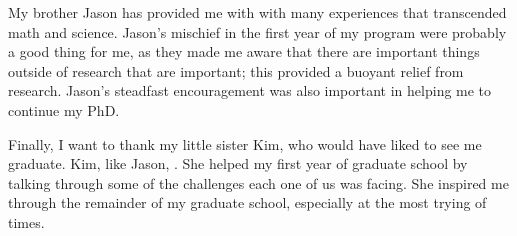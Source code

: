 My brother Jason has provided me with with many experiences that
transcended math and science.  Jason's mischief in the first year of
my program were probably a good thing for me, as they made me aware
that there are important things outside of research that are
important; this provided a buoyant relief from research.  Jason's
steadfast encouragement was also important in helping me to continue
my PhD.

Finally, I want to thank my little sister Kim, who would have liked to
see me graduate.  Kim, like Jason, .  She helped my first year of
graduate school by talking through some of the challenges each one of
us was facing.  She inspired me through the remainder of my graduate
school, especially at the most trying of times.
